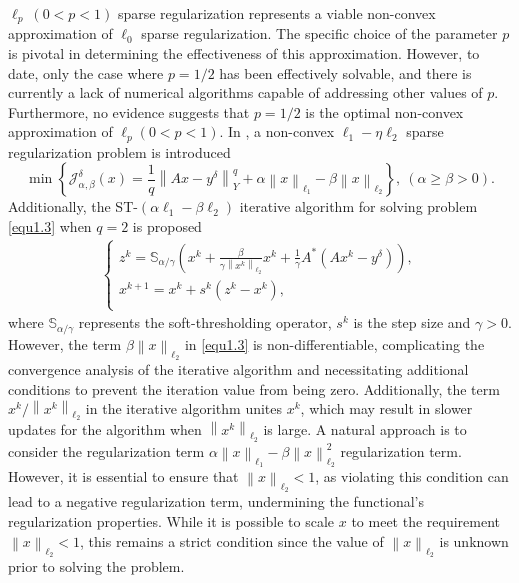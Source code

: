 \documentclass[a4paper,12pt]{article}
\numberwithin{equation}{section}
\begin{document}
\par $\ell_{p}\ (0<p<1)$ sparse regularization represents a viable non-convex approximation of $\ell_{0}$ sparse regularization. The specific choice of the parameter $p$ is pivotal in determining the effectiveness of this approximation. However, to date, only the case where $p=1/2$ has been effectively solvable, and there is currently a lack of numerical algorithms capable of addressing other values of $p$. Furthermore, no evidence suggests that $p=1/2$ is the optimal non-convex approximation of $\ell_{p}(0<p<1)$. In \cite{DH19}, a non-convex $\ell_{1}-\eta\ell_{2}$ sparse regularization problem is introduced
\begin{equation}\label{equ1.3}
    \min\left\{\mathcal{J}_{\alpha,\beta}^{\delta}(x)= \frac{1}{q}\left\|Ax-y^{\delta}\right\|_{Y}^{q}+\alpha\left\|x\right\|_{\ell_{1}} -\beta\left\|x\right\|_{\ell_{2}}\right\},\ \left(\alpha\geq\beta>0\right).
\end{equation}
Additionally, the ST-$\left(\alpha\ell_{1}-\beta\ell_{2}\right)$ iterative algorithm for solving problem \eqref{equ1.3} when $q=2$ is proposed
\begin{align*}
    \left\{             
        \begin{array}{ll}
        z^{k}=\mathbb{S}_{\alpha/\gamma}\left(x^{k}+\frac{\beta}{\gamma\left\|x^{k}\right\| _{\ell_{2}}}x^{k}+\frac{1}{\gamma}A^{*}\left(Ax^{k}-y^{\delta}\right)\right), \\
        x^{k+1}=x^{k}+s^{k}\left(z^{k}-x^{k}\right), \\
        \end{array}
    \right.
\end{align*}
where $\mathbb{S}_{\alpha/\gamma}$ represents the soft-thresholding operator, $s^{k}$ is the step size and $\gamma>0$. However, the term $\beta\left\|x\right\|_{\ell_{2}}$ in \eqref{equ1.3} is non-differentiable, complicating the convergence analysis of the iterative algorithm and necessitating additional conditions to prevent the iteration value from being zero. Additionally, the term $x^{k}/\left\|x^{k}\right\|_{\ell_{2}}$ in the iterative algorithm unites $x^{k}$, which may result in slower updates for the algorithm when $\left\|x^{k}\right\|_{\ell_{2}}$ is large. A natural approach is to consider the regularization term $\alpha\left\|x\right\|_{\ell_{1}}-\beta\left\|x\right\|_{\ell_{2}}^{2}$ regularization term. However, it is essential to ensure that $\left\|x\right\|_{\ell_{2}}<1$, as violating this condition can lead to a negative regularization term, undermining the functional's regularization properties. While it is possible to scale $x$ to meet the requirement $\left\|x\right\|_{\ell_{2}}<1$, this remains a strict condition since the value of $\left\|x\right\|_{\ell_{2}}$ is unknown prior to solving the problem. 
\end{document}
